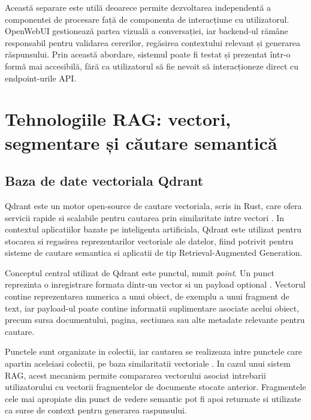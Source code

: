 \documentclass[12pt, a4paper, oneside, romanian]{teza-upb}
\begin{document}
Această separare este utilă deoarece permite dezvoltarea independentă a componentei de procesare față de componenta de interacțiune cu utilizatorul. OpenWebUI gestionează partea vizuală a conversației, iar backend-ul rămâne responsabil pentru validarea cererilor, regăsirea contextului relevant și generarea răspunsului. Prin această abordare, sistemul poate fi testat și prezentat într-o formă mai accesibilă, fără ca utilizatorul să fie nevoit să interacționeze direct cu endpoint-urile API.




\section{Tehnologiile RAG: vectori, segmentare și căutare semantică}

\subsection{Baza de date vectoriala Qdrant}

Qdrant este un motor open-source de cautare vectoriala, scris in Rust, care ofera servicii rapide si scalabile pentru cautarea prin similaritate intre vectori \cite{qdrant_doc}. In contextul aplicatiilor bazate pe inteligenta artificiala, Qdrant este utilizat pentru stocarea si regasirea reprezentarilor vectoriale ale datelor, fiind potrivit pentru sisteme de cautare semantica si aplicatii de tip Retrieval-Augmented Generation.

Conceptul central utilizat de Qdrant este punctul, numit \textit{point}. Un punct reprezinta o inregistrare formata dintr-un vector si un payload optional \cite{qdrant_points}. Vectorul contine reprezentarea numerica a unui obiect, de exemplu a unui fragment de text, iar payload-ul poate contine informatii suplimentare asociate acelui obiect, precum sursa documentului, pagina, sectiunea sau alte metadate relevante pentru cautare.

Punctele sunt organizate in colectii, iar cautarea se realizeaza intre punctele care apartin aceleiasi colectii, pe baza similaritatii vectoriale \cite{qdrant_points}. In cazul unui sistem RAG, acest mecanism permite compararea vectorului asociat intrebarii utilizatorului cu vectorii fragmentelor de documente stocate anterior. Fragmentele cele mai apropiate din punct de vedere semantic pot fi apoi returnate si utilizate ca surse de context pentru generarea raspunsului.
\end{document}
